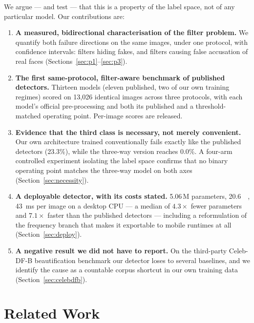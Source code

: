 \documentclass[conference]{IEEEtran}
\begin{document}
We argue --- and test --- that this is a property of the label space, not of any particular
model. Our contributions are:

\begin{enumerate}
\item \textbf{A measured, bidirectional characterisation of the filter problem.} We
      quantify both failure directions on the same images, under one protocol, with
      confidence intervals: filters hiding fakes, and filters causing false accusation of
      real faces (Sections~\ref{sec:p1}--\ref{sec:p3}).
\item \textbf{The first same-protocol, filter-aware benchmark of published detectors.}
      Thirteen models (eleven published, two of our own training regimes) scored on
      13{,}026 identical images across three protocols, with each model's official
      pre-processing and both its published and a threshold-matched operating point.
      Per-image scores are released.
\item \textbf{Evidence that the third class is necessary, not merely convenient.}
      Our own architecture trained conventionally fails exactly like the published
      detectors (23.3\%), while the three-way version reaches 0.0\%. A four-arm controlled
      experiment isolating the label space confirms that no binary operating point matches
      the three-way model on both axes (Section~\ref{sec:necessity}).
\item \textbf{A deployable detector, with its costs stated.} 5.06\,M parameters,
      \SI{20.6}{\mega\byte}, \SI{43}{\milli\second} per image on a desktop CPU ---
      a median of $4.3\times$ fewer parameters and $7.1\times$ faster than the published
      detectors --- including a reformulation of the frequency branch that makes it
      exportable to mobile runtimes at all (Section~\ref{sec:deploy}).
\item \textbf{A negative result we did not have to report.} On the third-party Celeb-DF-B
      beautification benchmark our detector loses to several baselines, and we identify
      the cause as a countable corpus shortcut in our own training data
      (Section~\ref{sec:celebdfb}).
\end{enumerate}

\section{Related Work}
\end{document}
